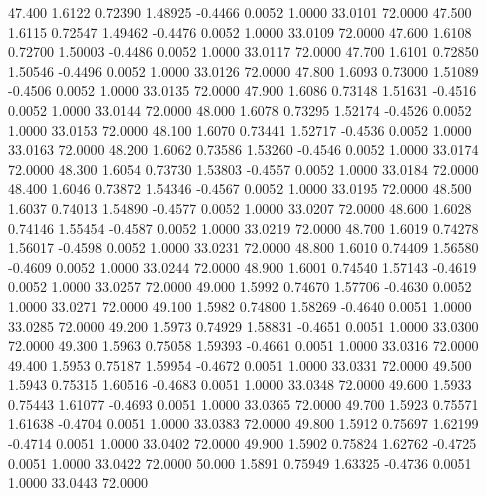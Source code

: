   47.400   1.6122   0.72390   1.48925  -0.4466   0.0052   1.0000  33.0101  72.0000
  47.500   1.6115   0.72547   1.49462  -0.4476   0.0052   1.0000  33.0109  72.0000
  47.600   1.6108   0.72700   1.50003  -0.4486   0.0052   1.0000  33.0117  72.0000
  47.700   1.6101   0.72850   1.50546  -0.4496   0.0052   1.0000  33.0126  72.0000
  47.800   1.6093   0.73000   1.51089  -0.4506   0.0052   1.0000  33.0135  72.0000
  47.900   1.6086   0.73148   1.51631  -0.4516   0.0052   1.0000  33.0144  72.0000
  48.000   1.6078   0.73295   1.52174  -0.4526   0.0052   1.0000  33.0153  72.0000
  48.100   1.6070   0.73441   1.52717  -0.4536   0.0052   1.0000  33.0163  72.0000
  48.200   1.6062   0.73586   1.53260  -0.4546   0.0052   1.0000  33.0174  72.0000
  48.300   1.6054   0.73730   1.53803  -0.4557   0.0052   1.0000  33.0184  72.0000
  48.400   1.6046   0.73872   1.54346  -0.4567   0.0052   1.0000  33.0195  72.0000
  48.500   1.6037   0.74013   1.54890  -0.4577   0.0052   1.0000  33.0207  72.0000
  48.600   1.6028   0.74146   1.55454  -0.4587   0.0052   1.0000  33.0219  72.0000
  48.700   1.6019   0.74278   1.56017  -0.4598   0.0052   1.0000  33.0231  72.0000
  48.800   1.6010   0.74409   1.56580  -0.4609   0.0052   1.0000  33.0244  72.0000
  48.900   1.6001   0.74540   1.57143  -0.4619   0.0052   1.0000  33.0257  72.0000
  49.000   1.5992   0.74670   1.57706  -0.4630   0.0052   1.0000  33.0271  72.0000
  49.100   1.5982   0.74800   1.58269  -0.4640   0.0051   1.0000  33.0285  72.0000
  49.200   1.5973   0.74929   1.58831  -0.4651   0.0051   1.0000  33.0300  72.0000
  49.300   1.5963   0.75058   1.59393  -0.4661   0.0051   1.0000  33.0316  72.0000
  49.400   1.5953   0.75187   1.59954  -0.4672   0.0051   1.0000  33.0331  72.0000
  49.500   1.5943   0.75315   1.60516  -0.4683   0.0051   1.0000  33.0348  72.0000
  49.600   1.5933   0.75443   1.61077  -0.4693   0.0051   1.0000  33.0365  72.0000
  49.700   1.5923   0.75571   1.61638  -0.4704   0.0051   1.0000  33.0383  72.0000
  49.800   1.5912   0.75697   1.62199  -0.4714   0.0051   1.0000  33.0402  72.0000
  49.900   1.5902   0.75824   1.62762  -0.4725   0.0051   1.0000  33.0422  72.0000
  50.000   1.5891   0.75949   1.63325  -0.4736   0.0051   1.0000  33.0443  72.0000
